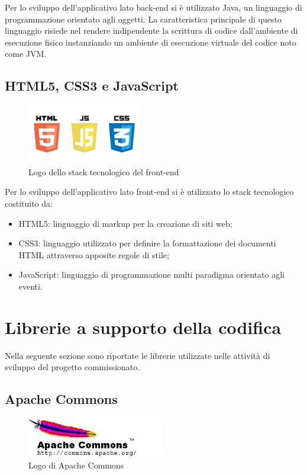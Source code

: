\noindent Per lo sviluppo dell'applicativo lato back-end si è utilizzato Java, un linguaggio di programmazione orientato agli oggetti. La caratteristica principale di questo linguaggio risiede nel rendere indipendente la scrittura di codice dall'ambiente di esecuzione fisico instanziando un ambiente di esecuzione virtuale del codice noto come JVM.

\subsection{HTML5, CSS3 e JavaScript}

\begin{figure}[!h]
	\centering
	\includegraphics[width=5cm]{../images/HTML5-logo.png}
	\caption{Logo dello stack tecnologico del front-end}
\end{figure}

\noindent Per lo sviluppo dell'applicativo lato front-end si è utilizzato lo stack tecnologico costituito da:
\begin{itemize}
\item HTML5: linguaggio di markup per la creazione di siti web;
\item CSS3: linguaggio utilizzato per definire la formattazione dei documenti HTML attraverso apposite regole di stile;
\item JavaScript: linguaggio di programmazione multi paradigma orientato agli eventi.
\end{itemize}

\pagebreak

\section{Librerie a supporto della codifica}
Nella seguente sezione sono riportate le librerie utilizzate nelle attività di sviluppo del progetto commissionato. 

\subsection{Apache Commons}

\begin{figure}[!h]
	\centering
	\includegraphics[width=6cm]{../images/Commons-logo.png}
	\caption{Logo di Apache Commons}
\end{figure}

